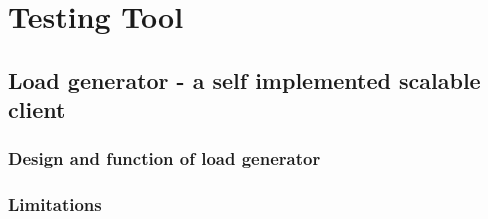\chapter{Testing Tool}
\section{Load generator - a self implemented scalable client}
\subsection{Design and function of load generator}
\label{load generator}

\subsection{Limitations}
